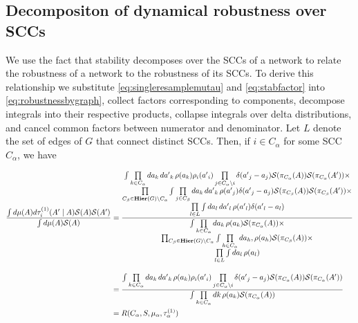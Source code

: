 \subsection{Decompositon of dynamical robustness over SCCs}

We use the fact that stability decomposes over the SCCs of a network to relate the robustness of a network to the robustness of its SCCs. To derive this relationship we substitute \ref{eq:singleresamplemutau} and \ref{eq:stabfactor} into \ref{eq:robustnessbygraph}, collect factors corresponding to components, decompose integrals into their respective products, collapse integrals over delta distributions, and cancel common factors between numerator and denominator.  Let $L$ denote the set of edges of $G$ that connect distinct SCCs.  Then, if $i \in C_\alpha$ for some SCC $C_\alpha$, we have
\begin{widetext}
\begin{equation}\label{eq:robustncessforsccs}
\begin{aligned}
\frac{\int d\mu(A) d\tau^{(1)}_i (A' \mid A) \mathcal{S}(A) \mathcal{S}(A')}
       {\int d\mu(A) \mathcal{S}(A)}
&= \frac{\begin{matrix}
  \int \prod\limits_{k \in C_\alpha} da_k\,d{a'}_k\, \rho(a_k)
    \rho_i({a'}_i) \prod\limits_{j \in C_\alpha \setminus i} \delta ({a'}_j - a_j)
    \mathcal{S}(\pi_{C_{\alpha}}(A)) \mathcal{S}(\pi_{C_{\alpha}}(A')) \times \\
 \prod\limits_{C_\beta \in \mathbf{Hier}(G) \setminus C_\alpha} \int
   \prod\limits_{j \in C_\beta} da_k\,d{a'}_k\, \rho({a'}_j) \delta ({a'}_j - a_j)
      \mathcal{S}(\pi_{C_{\beta}}(A)) \mathcal{S}(\pi_{C_{\beta}}(A')) \times \\
 \prod\limits_{l \in L} \int da_l\,d{a'}_l\,\rho({a'}_l) \delta({a'}_l - a_l) \end{matrix}}
{\begin{matrix}\int \prod\limits_{k \in C_\alpha} da_k\,\rho(a_k) \mathcal{S}(\pi_{C_{\alpha}}(A)) \times \\
 \prod_{C_\beta \in \mathbf{Hier}(G) \setminus C_\alpha}
   \int \prod\limits_{h \in C_\alpha} da_h,\rho(a_h) \mathcal{S}(\pi_{C_{\beta}}(A)) \times \\
 \prod\limits_{l \in L} \int da_l\,\rho(a_l) \end{matrix}} \\[1em]
&= \frac{\int \prod\limits_{k \in C_\alpha} da_k\,d{a'}_k\,\rho(a_k)
    \rho_i({a'}_i) \prod\limits_{j \in C_\alpha \setminus i} \delta ({a'}_j - a_j)
    \mathcal{S}(\pi_{C_{\alpha}}(A)) \mathcal{S}(\pi_{C_{\alpha}}(A'))}
{\int \prod\limits_{k \in C_\alpha} dk\, \rho(a_k) \mathcal{S}(\pi_{C_{\alpha}}(A))} \\
&= R(C_{\alpha}, S, \mu_\alpha, \tau^{(1)}_\alpha)
\end{aligned}
\end{equation}
\end{widetext}
